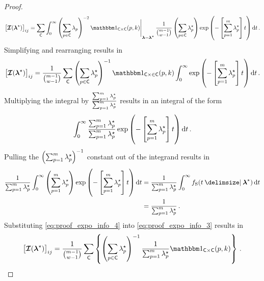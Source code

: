 \documentclass[
    11pt,
    extrafontsizes,
    article,
    oldfontcommands,
    final,
    oneside,
    openany,
    hidelinks]{memoir}
\begin{document}
\begin{proof}
\begin{equation}
    \left [ \infomatrx(\tparam{\vec\lambda}) \right ]_{i j} =
    \sum_{\cand}
    \int_{0}^{\infty}
    \eval{
        \left ( \sum_{p \in \cand} \lambda_p \right )^{-2} \SetIndicator{\cand \times \cand}(p,k)
    }_{\vec\lambda = \vec{\tparam\lambda}}
    \frac{1}{\binom{m-1}{w-1}}
    \left ( \sum_{p \in \cand} \tparam\lambda_p \right ) \exp \left ( - \left [ \sum_{p=1}^{m} \tparam\lambda_p \right ] t \right )
     \dif t\,.
\end{equation}
Simplifying and rearranging results in
\begin{equation}
\label{eq:proof_expo_info_3}
    \left [ \infomatrx(\tparam{\vec\lambda}) \right ]_{i j} =
    \frac{1}{\binom{m-1}{w-1}}
    \sum_{\cand}
    \left ( \sum_{p \in \cand} \tparam\lambda_p \right )^{-1}
    \SetIndicator{\cand \times \in \cand}(p,k)
    \int_{0}^{\infty}
    \exp \left ( - \left [ \sum_{p=1}^{m} \tparam\lambda_p \right ] t \right ) 
     \dif t\,.
\end{equation}
Multiplying the integral by $\frac{\sum_{p=1}^{m} {\lambda}^{\star}_p}{\sum_{p=1}^{m} {\lambda}^{\star}_p}$ results in an integral of the form
\begin{equation}
    \int_{0}^{\infty} \frac{\sum_{p=1}^{m} \tparam\lambda_p}{\sum_{p=1}^{m} \tparam\lambda_p} \exp \left ( - \left [ \sum_{p=1}^{m} \tparam\lambda_p \right ] t \right ) 
     \dif t\,.
\end{equation}
Pulling the $\left(\sum_{p=1}^{m} {\lambda}^{\star}_p\right)^{-1}$ constant out of the integrand results in
\begin{align}
    \frac{1}{\sum_{p=1}^{m} \tparam\lambda_p} \int_{0}^{\infty}
    \left ( \sum_{p=1}^{m} \tparam\lambda_p \right ) \exp \left ( - \left [ \sum_{p=1}^{m} \tparam\lambda_p \right ] t \right ) \dif t
    &= \frac{1}{\sum_{p=1}^{m} \tparam\lambda_p} \int_{0}^{\infty}
    \spdf(t \Given \tparam{\vec\lambda}) \dif t\\
\label{eq:proof_expo_info_4}
    &= \frac{1}{\sum_{p=1}^{m} \tparam\lambda_p}\,.
\end{align}
Substituting \cref{eq:proof_expo_info_4} into \cref{eq:proof_expo_info_3} results in
\begin{equation}
\label{eq:proof_expo_info_5}
    \left [ \infomatrx(\tparam{\vec\lambda}) \right ]_{i j} =
    \frac{1}{\binom{m-1}{w-1}}
    \sum_{\cand} \left\{
    \left ( \sum_{p \in \cand} \tparam\lambda_p \right )^{-1}
    \frac{1}{\sum_{p=1}^{m} \tparam\lambda_p} \SetIndicator{\cand \times \cand}(p,k) \right \}\,.
\end{equation}
\end{proof}
\end{document}
